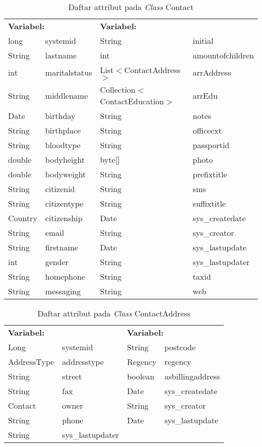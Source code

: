 \begin{table}[H]
	\caption{Daftar attribut pada \textit{Class} Contact}
	\centering
	\small
	\begin{adjustbox}{width=1\textwidth}	
		\begin{tabular}{|p{2cm} p{2.1cm} p{5cm} p{3.1cm}|}
			\hline
			\multicolumn{2}{|l}{\textbf{Variabel:}}&\multicolumn{2}{l|}{\textbf{Variabel:}}\\
			long&systemid&String&initial\\
			String&lastname&int&amountofchildren\\
			int&maritalstatus&List$<$ContactAddress$>$&arrAddress\\
			String&middlename&Collection$<$ContactEducation$>$&arrEdu\\
			Date&birthday&String&notes\\
			String&birthplace&String&officeext\\
			String&bloodtype&String&passportid\\
			double&bodyheight&byte[]&photo\\
			double&bodyweight&String&prefixtitle\\
			String&citizenid&String&sms\\
			String&citizentype&String&suffixtitle\\
			Country&citizenship&Date&sys\_createdate\\
			String&email&String&sys\_creator\\
			String&firstname&Date&sys\_lastupdate\\
			int&gender&String&sys\_lastupdater\\
			String&homephone&String&taxid\\
			String&messaging&String&web\\
			\hline
		\end{tabular}
	\end{adjustbox}
\end{table}
\begin{table}[H]
	\caption{Daftar attribut pada \textit{Class} ContactAddress}
	\centering
	\small
	\begin{adjustbox}{width=1\textwidth}	
		\begin{tabular}{|p{4cm} p{2.1cm} p{3cm} p{3.1cm}|}
			\hline
			\multicolumn{2}{|l}{\textbf{Variabel:}}&\multicolumn{2}{l|}{\textbf{Variabel:}}\\
			Long&systemid&String&postcode\\
			AddressType&addresstype&Regency&regency\\
			String&street&boolean&asbillingaddress\\
			String&fax&Date&sys\_createdate\\
			Contact&owner&String&sys\_creator\\
			String&phone&Date&sys\_lastupdate\\
			String&sys\_lastupdater&&\\
			\hline
		\end{tabular}
	\end{adjustbox}
\end{table}
